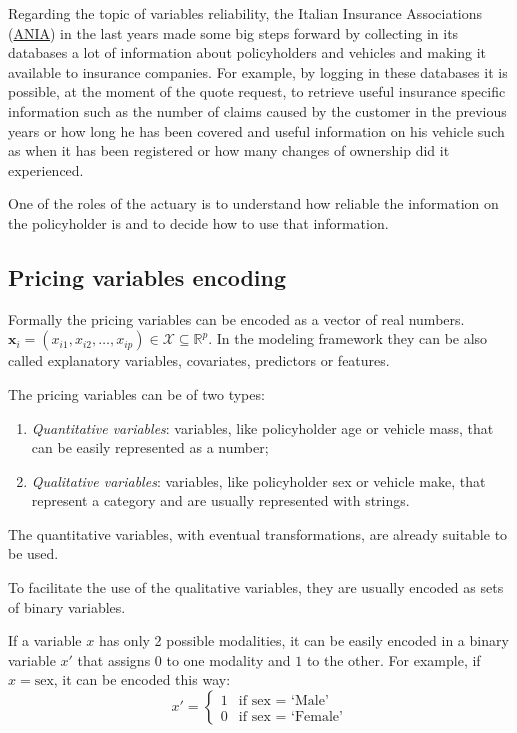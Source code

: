 \documentclass[a4paper, nobind]{templates/ociamthesis}
\providecommand{\tightlist}{%
  \setlength{\itemsep}{0pt}\setlength{\parskip}{0pt}}
\theoremstyle{definition}
\theoremstyle{definition}
\theoremstyle{definition}
\theoremstyle{remark}
\begin{document}
Regarding the topic of variables reliability, the Italian Insurance Associations (\href{https://www.ania.it/}{ANIA}) in the last years made some big steps forward by collecting in its databases a lot of information about policyholders and vehicles and making it available to insurance companies. For example, by logging in these databases it is possible, at the moment of the quote request, to retrieve useful insurance specific information such as the number of claims caused by the customer in the previous years or how long he has been covered and useful information on his vehicle such as when it has been registered or how many changes of ownership did it experienced.

One of the roles of the actuary is to understand how reliable the information on the policyholder is and to decide how to use that information.

\hypertarget{chap:pricing-variables-encoding}{%
\subsection{Pricing variables encoding}\label{chap:pricing-variables-encoding}}

Formally the pricing variables can be encoded as a vector of real numbers. \(\boldsymbol{x}_i=(x_{i1}, x_{i2}, \dots, x_{ip})\in\mathcal{X}\subseteq\mathbb{R}^p\). In the modeling framework they can be also called explanatory variables, covariates, predictors or features.

The pricing variables can be of two types:

\begin{enumerate}
\def\labelenumi{\arabic{enumi}.}
\tightlist
\item
  \emph{Quantitative variables}: variables, like policyholder age or vehicle mass, that can be easily represented as a number;
\item
  \emph{Qualitative variables}: variables, like policyholder sex or vehicle make, that represent a category and are usually represented with strings.
\end{enumerate}

The quantitative variables, with eventual transformations, are already suitable to be used.

To facilitate the use of the qualitative variables, they are usually encoded as sets of binary variables.

If a variable \(x\) has only 2 possible modalities, it can be easily encoded in a binary variable \(x'\) that assigns \(0\) to one modality and \(1\) to the other. For example, if \(x = \text{sex}\), it can be encoded this way:
\[
x' = \begin{cases}
1 & \text{if } \text{sex } = \text{ `Male'} \\
0 & \text{if } \text{sex } = \text{ `Female'}
\end{cases}
\]
\end{document}
